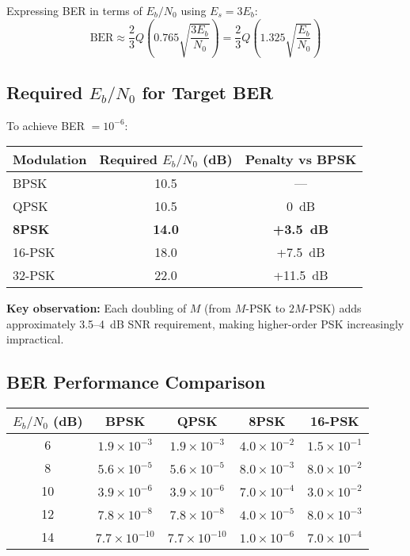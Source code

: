 Expressing BER in terms of $E_b/N_0$ using $E_s = 3E_b$:
\begin{equation}
\mathrm{BER} \approx \frac{2}{3}Q\left(0.765\sqrt{\frac{3E_b}{N_0}}\right) = \frac{2}{3}Q\left(1.325\sqrt{\frac{E_b}{N_0}}\right)
\end{equation}

\subsection{Required $E_b/N_0$ for Target BER}

To achieve BER $= 10^{-6}$:

\begin{center}
\begin{tabular}{@{}lcc@{}}
\toprule
Modulation & Required $E_b/N_0$ (dB) & Penalty vs BPSK \\
\midrule
BPSK & 10.5 & --- \\
QPSK & 10.5 & 0~dB \\
\textbf{8PSK} & \textbf{14.0} & \textbf{+3.5~dB} \\
16-PSK & 18.0 & +7.5~dB \\
32-PSK & 22.0 & +11.5~dB \\
\bottomrule
\end{tabular}
\end{center}

\textbf{Key observation:} Each doubling of $M$ (from $M$-PSK to $2M$-PSK) adds approximately 3.5--4~dB SNR requirement, making higher-order PSK increasingly impractical.

\subsection{BER Performance Comparison}

\begin{center}
\begin{tabular}{@{}ccccc@{}}
\toprule
$E_b/N_0$ (dB) & BPSK & QPSK & 8PSK & 16-PSK \\
\midrule
6 & $1.9 \times 10^{-3}$ & $1.9 \times 10^{-3}$ & $4.0 \times 10^{-2}$ & $1.5 \times 10^{-1}$ \\
8 & $5.6 \times 10^{-5}$ & $5.6 \times 10^{-5}$ & $8.0 \times 10^{-3}$ & $8.0 \times 10^{-2}$ \\
10 & $3.9 \times 10^{-6}$ & $3.9 \times 10^{-6}$ & $7.0 \times 10^{-4}$ & $3.0 \times 10^{-2}$ \\
12 & $7.8 \times 10^{-8}$ & $7.8 \times 10^{-8}$ & $4.0 \times 10^{-5}$ & $8.0 \times 10^{-3}$ \\
14 & $7.7 \times 10^{-10}$ & $7.7 \times 10^{-10}$ & $1.0 \times 10^{-6}$ & $7.0 \times 10^{-4}$ \\
\bottomrule
\end{tabular}
\end{center}

